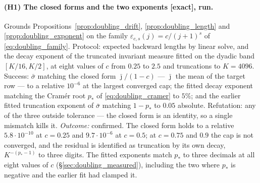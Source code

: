 \paragraph{(H1) The closed forms and the two exponents [exact], run.}
Grounds Propositions~\ref{prop:doubling_drift}, \ref{prop:doubling_length} and
\ref{prop:doubling_exponent} on the family $\varepsilon_{c,s}(j)=c/(j+1)^s$ of
\eqref{eq:doubling_family}. Protocol: expected backward lengths by linear solve, and the decay
exponent of the truncated invariant measure fitted on the dyadic band $[K/16,K/2]$, at eight
values of $c$ from $0.25$ to $2.5$ and truncations to $K=4096$. Success: $\bar\sigma$ matching
the closed form $\bar\jmath/(1-c)$ --- $\bar\jmath$ the mean of the target row --- to a
relative $10^{-6}$ at the largest converged cap; the fitted decay exponent matching the
Cram\'er root $p_*$ of \eqref{eq:doubling_cramer} to $5\%$; and the earlier fitted truncation
exponent of $\bar\sigma$ matching $1-p_*$ to $0.05$ absolute. Refutation: any of the three
outside tolerance --- the closed form is an identity, so a single mismatch kills it.
\emph{Outcome:} confirmed. The closed form holds to a relative $5.8\cdot10^{-10}$ at $c=0.25$
and $9.7\cdot10^{-6}$ at $c=0.5$; at $c=0.75$ and $0.9$ the cap is not converged, and the
residual is identified as truncation by its own decay, $K^{-(p_*-1)}$ to three digits. The
fitted exponents match $p_*$ to three decimals at all eight values of $c$
(\S\ref{sec:doubling_measured}), including the two where $p_*$ is negative and the earlier fit
had clamped it.

